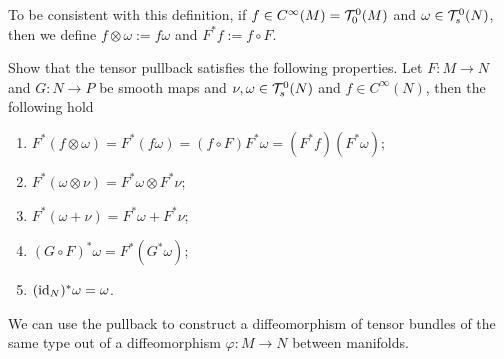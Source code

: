 To be consistent with this definition, if $f\in C^\infty(M) = \mathcal{T}_0^0(M)$ and $\omega \in\mathcal{T}_s^0(N)$, then we define $f\otimes \omega := f\omega$ and $F^* f := f\circ F$.

\begin{exercise}
  Show that the tensor pullback satisfies the following properties.
  Let $F:M\to N$ and $G:N\to P$ be smooth maps and $\nu, \omega \in\mathcal{T}_s^0(N)$ and $f\in C^\infty(N)$, then the following hold
  \begin{enumerate}
    \item $F^*(f\otimes\omega) = F^*(f \omega) = (f\circ F) F^*\omega = (F^* f)(F^*\omega)$;
    \item $F^*(\omega\otimes\nu) = F^*\omega\otimes F^*\nu$;
    \item $F^*(\omega + \nu) = F^*\omega + F^*\nu$;
    \item $(G\circ F)^*\omega = F^*(G^* \omega)$;
    \item $(\operatorname{id}_N)^* \omega = \omega$.
  \end{enumerate}
\end{exercise}

We can use the pullback to construct a diffeomorphism of tensor bundles of the same type out of a diffeomorphism $\varphi:M\to N$ between manifolds.

